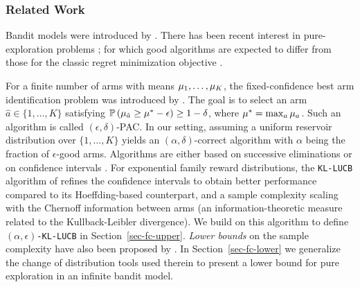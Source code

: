\subsubsection{Related Work}\label{sec-related}

Bandit models were introduced by
\cite{10.2307/2332286}.
There has been recent interest in
pure-exploration problems
\citep{EvenDaral06,DBLP:conf/colt/AudibertBM10}; for which good algorithms
are expected to differ from those for the classic
regret minimization objective
\citep{Bubeckal11,ESAIM17}.

For a finite number of arms with means $\mu_1,\dots,\mu_K$, the fixed-confidence
best arm identification problem was introduced by \cite{EvenDaral06}. The goal
is to
select an arm $\hat{a} \in \{1,\dots,K\}$ satisfying
$\mathbb{P}\left(  \mu_{\hat{a}} \geq \mu^* - \epsilon  \right) \geq 1-\delta$, where
$\mu^* = \max_a \mu_a$. Such an algorithm is called $(\epsilon,\delta)$-PAC.
In our setting, assuming a uniform reservoir distribution over
$\{1,\dots,K\}$ yields an $(\alpha,\delta)$-correct algorithm with $\alpha$
being the fraction of $\epsilon$-good arms. 
Algorithms are either
based on successive eliminations \citep{EvenDaral06,icml2013_karnin13} or on 
confidence intervals
\citep{DBLP:conf/icml/KalyanakrishnanTAS12,NIPS2012_4640}. For exponential family reward
distributions, the \texttt{KL-LUCB}
algorithm of \cite{COLT13} refines the confidence
intervals to obtain better performance compared to its Hoeffding-based
counterpart, and a sample complexity scaling with the Chernoff information
between arms
(an information-theoretic measure related to the Kullback-Leibler
divergence). We build on this algorithm to define \texttt{$(\alpha,\epsilon)$-KL-LUCB} in
Section~\ref{sec-fc-upper}. \emph{Lower bounds} on the sample complexity have
also
been proposed by \cite{Mannor04thesample,JMLR15,GK16}.
 In Section~\ref{sec-fc-lower} we generalize the change of
distribution tools used therein to present a lower bound for pure exploration
in an infinite bandit model.

